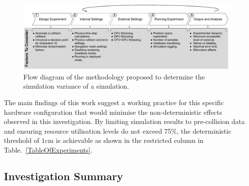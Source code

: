 \documentclass[letterpaper, 10 pt, journal, twoside]{IEEEtran}
\begin{document}
%
\begin{figure}[b]
    \centering
    \includegraphics[width=0.99\linewidth]{Other/Figures/MethodologyDiagram.pdf}
    \caption{Flow diagram of the methodology proposed to determine the simulation variance of a simulation.}
    \label{method_diagram}
\end{figure}


The main findings of this work suggest a working practice for this specific hardware configuration that would minimise the non-deterministic effects observed in this investigation. By limiting simulation results to pre-collision data and ensuring resource utilisation levels do not exceed 75\%, the deterministic threshold of $1$cm is achievable as shown in the restricted column in Table.~\ref{TableOfExperiments}.

\subsection{Investigation Summary} \label{s:empirical_summary}
\end{document}

